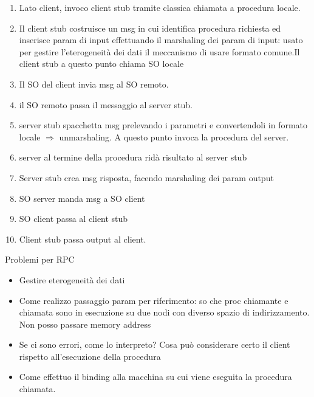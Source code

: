 \documentclass[16px]{article}
\begin{document}
\begin{enumerate}
\item Lato client, invoco client stub tramite classica chiamata a procedura locale.
\item Il client stub costruisce un msg in cui identifica procedura richiesta ed inserisce param di input effettuando il marshaling dei param di input: usato per gestire l'eterogeneità dei dati il meccanismo di usare formato comune.Il client stub a questo punto chiama SO locale
\item Il SO del client invia msg al SO remoto.
\item il SO remoto passa il messaggio al server stub.
\item server stub spacchetta msg prelevando i parametri e convertendoli in formato locale $\Rightarrow$ unmarshaling. A questo punto invoca la procedura del server.
\item server al termine della procedura ridà risultato al server stub
\item Server stub crea msg risposta, facendo marshaling dei param output
\item SO server manda msg a SO client
\item SO client passa al client stub
\item Client stub passa output al client.
\end{enumerate}
Problemi per RPC
\begin{itemize}
\item Gestire eterogeneità dei dati
\item Come realizzo passaggio param per riferimento: so che proc chiamante e chiamata sono in esecuzione su due nodi con diverso spazio di indirizzamento. Non posso passare memory address
\item Se ci sono errori, come lo interpreto? Cosa può considerare certo il client rispetto all'esecuzione della procedura
\item Come effettuo il binding alla macchina su cui viene eseguita la procedura chiamata.
\end{itemize}
\end{document}
